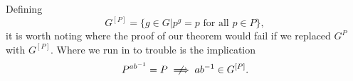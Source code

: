 \documentclass[12pt]{article}
\begin{document}
Defining
\begin{equation*}
G^{[P]}=\{g\in G|\mbox{$p^g=p$ for all $p\in P$}\},
\end{equation*}
it is worth noting where the proof of our theorem would fail
if we replaced $G^P$ with $G^{[P]}$.  Where we run in to trouble
is the implication
\begin{equation*}
P^{ab^{-1}}=P\centernot\implies ab^{-1}\in G^{[P]}.
\end{equation*}

\end{document}
